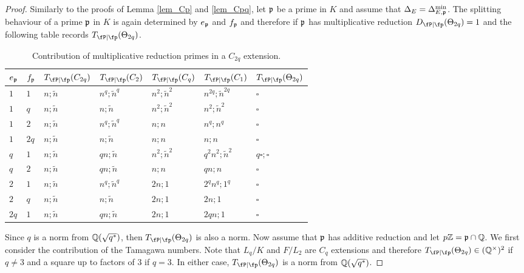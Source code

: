 \begin{proof}
    Similarly to the proofs of Lemma \ref{lem_Cp} and \ref{lem_Cpq}, let $\mathfrak{p}$ be a prime in $K$ and assume that $\Delta_E=\Delta_{E,\mathfrak{p}}^{\min}$. The splitting behaviour of a prime $\mathfrak{p}$ in $K$ is again determined by $e_{\mathfrak{p}}$ and $f_{\mathfrak{p}}$ and therefore if $\mathfrak{p}$ has multiplicative reduction $\Dp(\Theta_{2q})=1$ and the following table records $\Tp(\Theta_{2q})$.

    \begin{table}[!ht]
        \centering
        \begin{tabular}{|l|l|l|l|l|l|l|}
        \hline
        $e_{\mathfrak{p}}$ & $f_{\mathfrak{p}}$  & $\Tp(C_{2q})$ & $\Tp(C_2)$ & $\Tp(C_q)$ & $\Tp(C_1)$ & $\Tp(\Theta_{2q})$ \\ \hline
        $1$ & $1$ & $n;\tilde{n}$ & $n^q;\tilde{n}^q$ & $n^2;\tilde{n}^2$ & $n^{2q};\tilde{n}^{2q}$ & $\square$ \\ \hline
        $1$ & $q$ & $n;\tilde{n}$ & $n;\tilde{n}$ & $n^2;\tilde{n}^2$ & $n^2;\tilde{n}^2$ & $\square$ \\ \hline
        $1$ & $2$ & $n;\tilde{n}$ & $n^q;\tilde{n}^q$ & $n;n$ & $n^q;n^q$ & $\square$ \\ \hline
        $1$ & $2q$ & $n;\tilde{n}$ & $n;\tilde{n}$ & $n;n$ & $n;n$ & $\square$ \\ \hline
        $q$ & $1$ & $n;\tilde{n}$ & $qn;\tilde{n}$ & $n^2;\tilde{n}^2$ & $q^2n^2;\tilde{n}^2$ & $q\square;\square$ \\ \hline
        $q$ & $2$ & $n;\tilde{n}$ & $qn;\tilde{n}$ & $n;n$ & $qn;n$ & $\square$ \\ \hline
        $2$ & $1$ & $n;\tilde{n}$ & $n^q;\tilde{n}^q$ & $2n;1$ & $2^qn^q;1^q$ & $\square$ \\ \hline
        $2$ & $q$ & $n;\tilde{n}$ & $n;\tilde{n}$ & $2n;1$ & $2n;1$ & $\square$ \\ \hline
        $2q$ & $1$ & $n;\tilde{n}$ & $qn;\tilde{n}$ & $2n;1$ & $2qn;1$ & $\square$ \\ \hline
        \end{tabular}
        \caption{Contribution of multiplicative reduction primes in a $C_{2q}$ extension.}
    \end{table}

    Since $q$ is a norm from $\mathbb{Q}(\sqrt{q^*})$, then $\Tp(\Theta_{2q})$ is also a norm. Now assume that $\mathfrak{p}$ has additive reduction and let $p\mathbb{Z}=\mathfrak{p}\cap\mathbb{Q}$. We first consider the contribution of the Tamagawa numbers. Note that $L_q/K$ and $F/L_2$ are $C_q$ extensions and therefore $\Tp(\Theta_{2q})\in\QQss$ if $q\neq 3$ and a square up to factors of $3$ if $q=3$. In either case, $\Tp(\Theta_{2q})$ is a norm from $\mathbb{Q}(\sqrt{q^*})$.


\end{proof}
